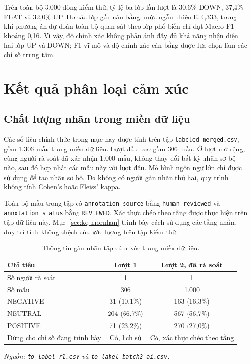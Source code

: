 \documentclass[12pt, a4paper, oneside]{report}
\begin{document}
Trên toàn bộ 3.000 dòng kiểm thử, tỷ lệ ba lớp lần lượt là 30,6\% DOWN, 37,4\% FLAT và
32,0\% UP. Do các lớp gần cân bằng, mức ngẫu nhiên là 0,333, trong khi phương án dự đoán
toàn bộ quan sát theo lớp phổ biến chỉ đạt Macro-F1 khoảng 0,16. Vì vậy, độ chính xác không
phản ánh đầy đủ khả năng nhận diện hai lớp UP và DOWN; F1 vĩ mô và độ chính xác cân bằng
được lựa chọn làm các chỉ số trung tâm.
\section{Kết quả phân loại cảm xúc}
\label{sec:kq-sentiment}

\subsection{Chất lượng nhãn trong miền dữ liệu}

Các số liệu chính thức trong mục này được tính trên tập \texttt{labeled\_merged.csv}, gồm 1.306
mẫu trong miền dữ liệu. Lượt đầu bao gồm 306 mẫu. Ở lượt mở rộng, cùng người rà soát đã
xác nhận 1.000 mẫu, không thay đổi bất kỳ nhãn sơ bộ nào, sau đó hợp nhất các mẫu này với
lượt đầu. Mô hình ngôn ngữ lớn chỉ được sử dụng để tạo nhãn sơ bộ. Do không có người gán
nhãn thứ hai, quy trình không tính Cohen's hoặc Fleiss' kappa.

Toàn bộ mẫu trong tập có \texttt{annotation\_source} bằng \texttt{human\_reviewed} và
\texttt{annotation\_status} bằng \texttt{REVIEWED}. Xác thực chéo theo tầng được thực
hiện trên tập dữ liệu này. Mục~\ref{sec:kq-mornhan} trình bày cách sử dụng các tầng nhằm
duy trì tính không chệch của ước lượng trên tập kiểm thử.

\begin{table}[H]
  \centering
  \caption{Thông tin gán nhãn tập cảm xúc trong miền dữ liệu.}
  \label{tab:kq-annotation}
  \begin{tabular}{p{7.6cm} c c}
    \toprule
    Chỉ tiêu & Lượt 1 & Lượt 2, đã rà soát \\
    \midrule
    Số người rà soát & 1 & 1 \\
    Số mẫu & 306 & 1.000 \\
    NEGATIVE & 31 (10,1\%) & 163 (16,3\%) \\
    NEUTRAL & 204 (66,7\%) & 567 (56,7\%) \\
    POSITIVE & 71 (23,2\%) & 270 (27,0\%) \\
    Dùng cho chỉ số đang trình bày & Có, lịch sử & Có, xác thực chéo theo tầng \\
    \bottomrule
  \end{tabular}
\noindent\textit{Nguồn: \texttt{to\_label\_r1.csv} và \texttt{to\_label\_batch2\_ai.csv}.}
\end{table}
\end{document}
